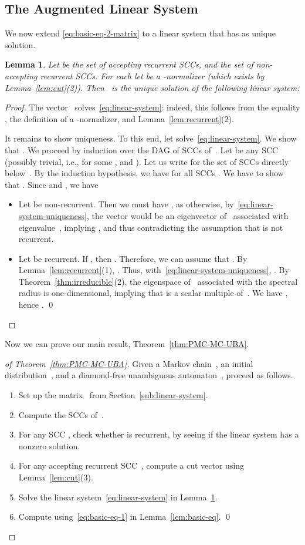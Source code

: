 \documentclass{elsarticle}
\newtheorem{lemma}[definition]{Lemma}
\begin{document}
\subsection{The Augmented Linear System} \label{sub:augmented}
We now extend \eqref{eq:basic-eq-2-matrix} to a linear
system that has  as unique solution.
\begin{lemma} \label{lem:linear-system}
Let  be the set of accepting recurrent SCCs, and  the
set of non-accepting recurrent SCCs.  For each  let
 be a -normalizer (which
exists by Lemma~\ref{lem:cut}(2)).  Then ~is the unique
solution of the following linear system:

\end{lemma}
\begin{proof}
  The vector~ solves~\eqref{eq:linear-system}: indeed, this
  follows from the equality , the definition of a
  -normalizer, and Lemma~\ref{lem:recurrent}(2).

  It remains to show uniqueness.  To this end, let
   solve~\eqref{eq:linear-system}.  We show that
  .
We proceed by induction over the DAG of SCCs of~.
Let  be any SCC (possibly trivial, i.e.,  for some , and ).
Let us write  for the set of SCCs directly below~.
By the induction hypothesis, we have  for all SCCs .
We have to show that .
Since  and , we have


\begin{itemize}
\item
Let  be non-recurrent.
Then we must have , as otherwise, by~\eqref{eq:linear-system-uniqueness}, the vector  would be an eigenvector of~ associated with eigenvalue~, implying , and thus contradicting the assumption that  is not recurrent.
\item
Let  be recurrent. If , then .
Therefore, we can assume that .
By Lemma~\ref{lem:recurrent}(1), .
Thus, with~\eqref{eq:linear-system-uniqueness}, .
By Theorem~\ref{thm:irreducible}(2), the eigenspace of~ associated with the spectral radius is one-dimensional, implying that  is a scalar multiple of~.
We have , hence .
\qed
\end{itemize}
\end{proof}

Now we can prove our main result, Theorem~\ref{thm:PMC-MC-UBA}.
\begin{proof}[of Theorem~\ref{thm:PMC-MC-UBA}]
Given a Markov chain~, an initial distribution~, and a diamond-free unambiguous automaton~, proceed as follows.
\begin{enumerate}
\item Set up the matrix~ from Section~\ref{sub:linear-system}.
\item Compute the SCCs of~.
\item For any SCC , check whether  is recurrent, by seeing if the linear system  has a nonzero solution.
\item For any accepting recurrent SCC~, compute a cut vector  using Lemma~\ref{lem:cut}(3).
\item Solve the linear system~\eqref{eq:linear-system} in Lemma~\ref{lem:linear-system}.
\item Compute  using~\eqref{eq:basic-eq-1} in Lemma~\ref{lem:basic-eq}. \qed
\end{enumerate}
\end{proof}
\end{document}
